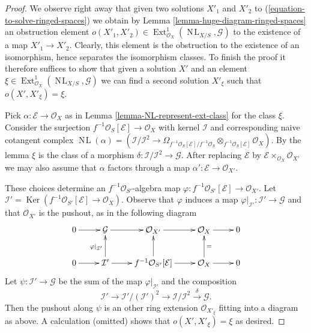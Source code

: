 \documentclass{stacks-project}
\theoremstyle{plain}
\theoremstyle{definition}
\theoremstyle{remark}
\numberwithin{equation}{subsection}
\def\Ext{\mathop{\mathrm{Ext}}\nolimits}
\def\NL{\mathop{N\!L}\nolimits}
\def\Ker{\mathop{\mathrm{Ker}}}
\begin{document}
\begin{proof}
We observe right away that given two solutions $X'_1$ and $X'_2$
to (\ref{equation-to-solve-ringed-spaces}) we obtain by
Lemma \ref{lemma-huge-diagram-ringed-spaces} an obstruction element
$o(X'_1, X'_2) \in \Ext^1_{\mathcal{O}_X}(\NL_{X/S}, \mathcal{G})$
to the existence of a map $X'_1 \to X'_2$. Clearly, this element
is the obstruction to the existence of an isomorphism, hence separates
the isomorphism classes. To finish the proof it therefore suffices to
show that given a solution $X'$ and an element
$\xi \in \Ext^1_{\mathcal{O}_X}(\NL_{X/S}, \mathcal{G})$
we can find a second solution $X'_\xi$ such that
$o(X', X'_\xi) = \xi$.

\medskip\noindent
Pick $\alpha : \mathcal{E} \to \mathcal{O}_X$ as in
Lemma \ref{lemma-NL-represent-ext-class}
for the class $\xi$. Consider the surjection
$f^{-1}\mathcal{O}_S[\mathcal{E}] \to \mathcal{O}_X$
with kernel $\mathcal{I}$ and corresponding naive cotangent complex
$\NL(\alpha) = (\mathcal{I}/\mathcal{I}^2 \to
\Omega_{f^{-1}\mathcal{O}_S[\mathcal{E}]/f^{-1}\mathcal{O}_S}
\otimes_{f^{-1}\mathcal{O}_S[\mathcal{E}]} \mathcal{O}_X)$.
By the lemma $\xi$ is the class of a morphism
$\delta : \mathcal{I}/\mathcal{I}^2 \to \mathcal{G}$.
After replacing $\mathcal{E}$ by
$\mathcal{E} \times_{\mathcal{O}_X} \mathcal{O}_{X'}$ we may also assume
that $\alpha$ factors through a map
$\alpha' : \mathcal{E} \to \mathcal{O}_{X'}$.

\medskip\noindent
These choices determine an $f^{-1}\mathcal{O}_{S'}$-algebra map
$\varphi : f^{-1}\mathcal{O}_{S'}[\mathcal{E}] \to \mathcal{O}_{X'}$. Let
$\mathcal{I}' = \Ker(f^{-1}\mathcal{O}_{S'}[\mathcal{E}] \to \mathcal{O}_X)$.
Observe that $\varphi$ induces a map
$\varphi|_{\mathcal{I}'} : \mathcal{I}' \to \mathcal{G}$
and that $\mathcal{O}_{X'}$ is the pushout, as in the following
diagram
$$
\xymatrix{
0 \ar[r] & \mathcal{G} \ar[r] & \mathcal{O}_{X'} \ar[r] &
\mathcal{O}_X \ar[r] & 0 \\
0 \ar[r] & \mathcal{I}' \ar[u]^{\varphi|_{\mathcal{I}'}} \ar[r] &
f^{-1}\mathcal{O}_{S'}[\mathcal{E}] \ar[u] \ar[r] &
\mathcal{O}_X \ar[u]_{=} \ar[r] & 0
}
$$
Let $\psi : \mathcal{I}' \to \mathcal{G}$ be the sum of the map
$\varphi|_{\mathcal{I}'}$ and the composition
$$
\mathcal{I}' \to \mathcal{I}'/(\mathcal{I}')^2 \to
\mathcal{I}/\mathcal{I}^2 \xrightarrow{\delta} \mathcal{G}.
$$
Then the pushout along $\psi$ is an other ring extension
$\mathcal{O}_{X'_\xi}$ fitting into a diagram as above.
A calculation (omitted) shows that $o(X', X'_\xi) = \xi$ as desired.
\end{proof}
\end{document}
